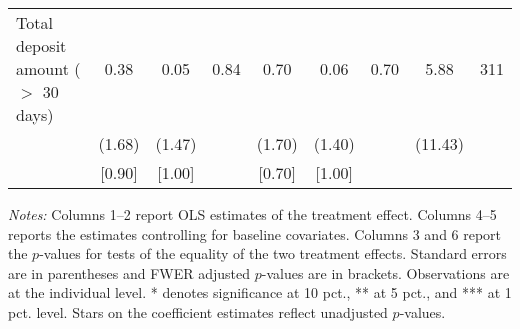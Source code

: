 \begin{table}[h]
{\begin{threeparttable}
\begin{tabular}{l*{8}{c}}
Total deposit amount ($>$ 30 days)&     0.38&     0.05&     0.84&     0.70&     0.06&     0.70&     5.88&      311\\
          &   (1.68)&   (1.47)&         &   (1.70)&   (1.40)&         &  (11.43)&         \\
          &   [0.90]&   [1.00]&         &   [0.70]&   [1.00]&         &         &         \\
\bottomrule \end{tabular} \begin{tablenotes}[flushleft] \footnotesize \item \emph{Notes:} Columns 1--2 report OLS estimates of the treatment effect. Columns 4--5 reports the estimates controlling for baseline covariates. Columns 3 and 6 report the \(p\)-values for tests of the equality of the two treatment effects. Standard errors are in parentheses and FWER adjusted \(p\)-values are in brackets. Observations are at the individual level. * denotes significance at 10 pct., ** at 5 pct., and *** at 1 pct. level. Stars on the coefficient estimates reflect unadjusted \(p\)-values. \end{tablenotes} \end{threeparttable} } \end{table}

